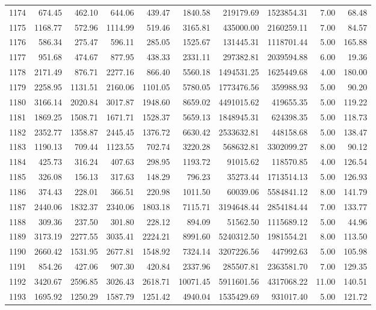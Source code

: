 \begin{tabular}{lrrrrrrrrr}
1174 & 674.45 & 462.10 & 644.06 & 439.47 & 1840.58 & 219179.69 & 1523854.31 & 7.00 & 68.48 \\
1175 & 1168.77 & 572.96 & 1114.99 & 519.46 & 3165.81 & 435000.00 & 2160259.11 & 7.00 & 84.57 \\
1176 & 586.34 & 275.47 & 596.11 & 285.05 & 1525.67 & 131445.31 & 1118701.44 & 5.00 & 165.88 \\
1177 & 951.68 & 474.67 & 877.95 & 438.33 & 2331.11 & 297382.81 & 2039594.88 & 6.00 & 19.36 \\
1178 & 2171.49 & 876.71 & 2277.16 & 866.40 & 5560.18 & 1494531.25 & 1625449.68 & 4.00 & 180.00 \\
1179 & 2258.95 & 1131.51 & 2160.06 & 1101.05 & 5780.05 & 1773476.56 & 359988.93 & 5.00 & 90.20 \\
1180 & 3166.14 & 2020.84 & 3017.87 & 1948.60 & 8659.02 & 4491015.62 & 419655.35 & 5.00 & 119.22 \\
1181 & 1869.25 & 1508.71 & 1671.71 & 1528.37 & 5659.13 & 1848945.31 & 624398.35 & 5.00 & 118.73 \\
1182 & 2352.77 & 1358.87 & 2445.45 & 1376.72 & 6630.42 & 2533632.81 & 448158.68 & 5.00 & 138.47 \\
1183 & 1190.13 & 709.44 & 1123.55 & 702.74 & 3220.28 & 568632.81 & 3302099.27 & 8.00 & 90.12 \\
1184 & 425.73 & 316.24 & 407.63 & 298.95 & 1193.72 & 91015.62 & 118570.85 & 4.00 & 126.54 \\
1185 & 326.08 & 156.13 & 317.63 & 148.29 & 796.23 & 35273.44 & 1713514.13 & 5.00 & 126.93 \\
1186 & 374.43 & 228.01 & 366.51 & 220.98 & 1011.50 & 60039.06 & 5584841.12 & 8.00 & 141.79 \\
1187 & 2440.06 & 1832.37 & 2340.06 & 1803.18 & 7115.71 & 3194648.44 & 2854184.44 & 7.00 & 133.77 \\
1188 & 309.36 & 237.50 & 301.80 & 228.12 & 894.09 & 51562.50 & 1115689.12 & 5.00 & 44.96 \\
1189 & 3173.19 & 2277.55 & 3035.41 & 2224.21 & 8991.60 & 5240312.50 & 1981554.21 & 8.00 & 113.50 \\
1190 & 2660.42 & 1531.95 & 2677.81 & 1548.92 & 7324.14 & 3207226.56 & 447992.63 & 5.00 & 105.98 \\
1191 & 854.26 & 427.06 & 907.30 & 420.84 & 2337.96 & 285507.81 & 2363581.70 & 7.00 & 129.35 \\
1192 & 3420.67 & 2596.85 & 3026.43 & 2618.71 & 10071.45 & 5911601.56 & 4317068.22 & 11.00 & 140.51 \\
1193 & 1695.92 & 1250.29 & 1587.79 & 1251.42 & 4940.04 & 1535429.69 & 931017.40 & 5.00 & 121.72 \\

\end{tabular}
